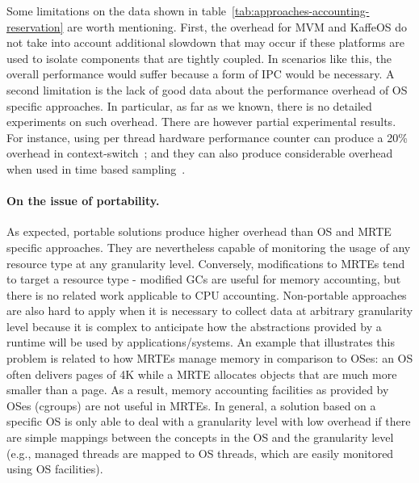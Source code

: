 Some limitations on the data shown in table~\ref{tab:approaches-accounting-reservation} are worth mentioning.
First, the overhead for MVM and KaffeOS do not take into account additional slowdown that may occur if these platforms are used to isolate components that are tightly coupled. 
In scenarios like this, the overall performance would suffer because a form of IPC would be necessary.
A second limitation is the lack of good data about the performance overhead of OS specific approaches.
In particular, as far as we known, there is no detailed experiments on such overhead.
There are however partial experimental results.
For instance, using per thread hardware performance counter can produce a 20\% overhead in context-switch~\cite{Weaver2013}; and they can also produce considerable overhead when used in time based sampling~\cite{Weaver2015}.

\paragraph{On the issue of portability.}
As expected, portable solutions produce higher overhead than OS and MRTE specific approaches.
They are nevertheless capable of monitoring the usage of any resource type at any granularity level.
Conversely, modifications to MRTEs tend to target a resource type - modified GCs are useful for memory accounting, but there is no related work applicable to CPU accounting.
Non-portable approaches are also hard to apply when it is necessary to collect data at arbitrary granularity level because it is complex to anticipate how the abstractions provided by a runtime will be used by applications/systems. 
An example that illustrates this problem is related to how MRTEs manage memory in comparison to OSes: an OS often delivers pages of 4K while a MRTE allocates objects that are much more smaller than a page.
As a result, memory accounting facilities as provided by OSes (cgroups) are not useful in MRTEs. 
In general, a solution based on a specific OS is only able to deal with a granularity level with low overhead if there are simple mappings between the concepts in the OS and the granularity level (e.g., managed threads are mapped to OS threads, which are easily monitored using OS facilities). 

